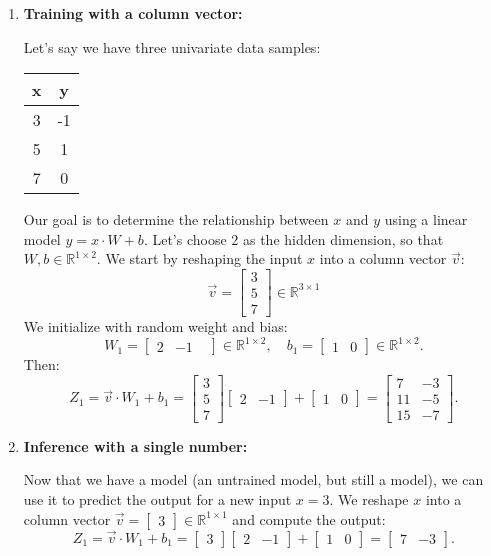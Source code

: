 \begin{enumerate}
    \item \textbf{Training with a column vector:}
    
    Let's say we have three univariate data samples:
    \begin{center}
    \begin{tabular}{ |c||c|  }
        x & y \\
        \hline
        3 & -1 \\
        5 & 1 \\
        7 & 0
    \end{tabular}
    \end{center}

    Our goal is to determine the relationship between $x$ and $y$ using a linear model $y = x\cdot W +b$. Let's choose $2$ as the hidden dimension, so that $W,b\in\mathbb{R}^{1\times 2}$. We start by reshaping the input $x$ into a column vector $\vec{v}$:
    $$\vec{v} = \begin{bmatrix}
    3 \\ 5 \\ 7 
    \end{bmatrix}\in \mathbb{R}^{3\times 1}$$
    We initialize with random weight and bias:
    $$W_1 = \begin{bmatrix} 2 & -1 & \end{bmatrix} \in \mathbb{R}^{1\times 2}, \quad b_1 = \begin{bmatrix} 1 & 0 \end{bmatrix} \in \mathbb{R}^{1\times 2}.$$
    Then: 
    $$Z_1 = \vec{v}\cdot W_1 + b_1 = \begin{bmatrix} 3 \\ 5 \\ 7 \end{bmatrix} \begin{bmatrix} 2 & -1 \end{bmatrix} + \begin{bmatrix} 1 & 0 \end{bmatrix} = \begin{bmatrix} 7 & -3 \\ 11 & -5 \\ 15 & -7 \end{bmatrix}.$$

    \item \textbf{Inference with a single number:}
    
    Now that we have a model (an untrained model, but still a model), we can use it to predict the output for a new input $x=3$. We reshape $x$ into a column vector $\vec{v} = \begin{bmatrix}3\end{bmatrix} \in \mathbb{R}^{1\times 1}$ and compute the output:
    $$Z_1 = \vec{v}\cdot W_1 + b_1 = \begin{bmatrix} 3 \end{bmatrix} \begin{bmatrix} 2 & -1 \end{bmatrix} + \begin{bmatrix} 1 & 0 \end{bmatrix} = \begin{bmatrix} 7 & -3 \end{bmatrix}.$$
\end{enumerate}